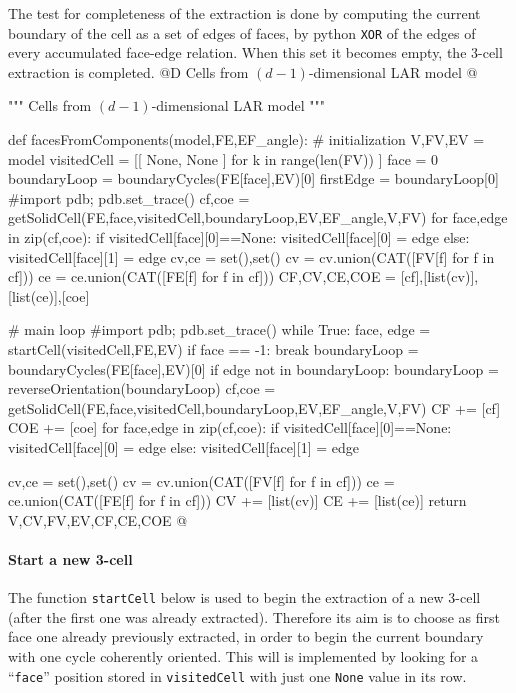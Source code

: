 \documentclass[11pt,oneside]{article}    %
\begin{document}
The test for completeness of the extraction is done by computing the current boundary of the cell as a set of edges of faces, by python \texttt{XOR} of the edges of every accumulated face-edge relation. When this set it becomes empty, the 3-cell extraction is completed.
@D Cells from $(d-1)$-dimensional LAR model
@{""" Cells from $(d-1)$-dimensional LAR model """

def facesFromComponents(model,FE,EF_angle):
    # initialization
    V,FV,EV = model
    visitedCell = [[ None, None ] for k in range(len(FV)) ]
    face = 0
    boundaryLoop = boundaryCycles(FE[face],EV)[0]
    firstEdge = boundaryLoop[0]
    #import pdb; pdb.set_trace()
    cf,coe = getSolidCell(FE,face,visitedCell,boundaryLoop,EV,EF_angle,V,FV)
    for face,edge in zip(cf,coe):
        if visitedCell[face][0]==None: visitedCell[face][0] = edge
        else: visitedCell[face][1] = edge
    cv,ce = set(),set()
    cv = cv.union(CAT([FV[f] for f in cf]))
    ce = ce.union(CAT([FE[f] for f in cf]))
    CF,CV,CE,COE = [cf],[list(cv)],[list(ce)],[coe]
    
    # main loop
    #import pdb; pdb.set_trace()
    while True:
        face, edge = startCell(visitedCell,FE,EV)
        if face == -1: break
        boundaryLoop = boundaryCycles(FE[face],EV)[0]
        if edge not in boundaryLoop:
            boundaryLoop = reverseOrientation(boundaryLoop)
        cf,coe = getSolidCell(FE,face,visitedCell,boundaryLoop,EV,EF_angle,V,FV)
        CF += [cf]
        COE += [coe]
        for face,edge in zip(cf,coe):
            if visitedCell[face][0]==None: visitedCell[face][0] = edge
            else: visitedCell[face][1] = edge
            
        cv,ce = set(),set()
        cv = cv.union(CAT([FV[f] for f in cf]))
        ce = ce.union(CAT([FE[f] for f in cf]))
        CV += [list(cv)]
        CE += [list(ce)]
    return V,CV,FV,EV,CF,CE,COE
@}
    

\paragraph{Start a new 3-cell}
The function \texttt{startCell} below is used to begin the extraction of a new 3-cell (after the first one was already extracted). Therefore its aim is to choose as first face one already previously extracted, in order to begin the current boundary with one cycle coherently oriented. This will is implemented by looking for a ``\texttt{face}'' position stored in \texttt{visitedCell} with just one \texttt{None} value in its row.
\end{document}
